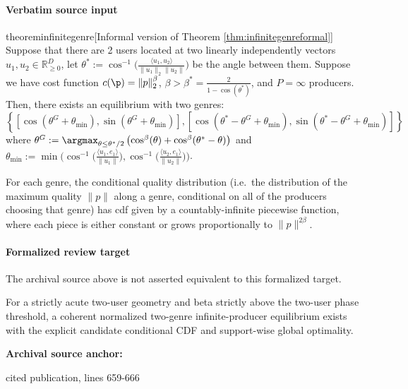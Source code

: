 \documentclass[10pt]{article}
\begin{document}
\paragraph{Verbatim source input}
\begin{ReviewVerbatim}
\begin{restatable}{theorem}{infinitegenre}[Informal version of Theorem \ref{thm:infinitegenreformal}]
\label{thm:infinitegenre}
Suppose that there are 2 users located at two linearly independently vectors $u_1, u_2 \in \mathbb{R}_{\ge 0}^D$, let $\theta^* := \cos^{-1}\Big( \frac{\langle u_1, u_2\rangle}{\|u_1\|_2 \|u_2\|} \Big)$ be the angle between them.  Suppose we have cost function $c(\p) = \|p\|_2^{\beta}$, $\beta > \beta^* = \frac{2}{1 - \cos(\theta^*)}$, and $P = \infty$ producers. Then, there exists an equilibrium with two genres:
\[\left\{[\cos(\theta^G + \theta_{\text{min}}), \sin(\theta^G + \theta_{\text{min}})], [\cos(\theta^* - \theta^G + \theta_{\text{min}}), \sin(\theta^* - \theta^G + \theta_{\text{min}})] \right\} \]
where $\theta^G := \argmax_{\theta \le \theta^*/2} \left(\cos^{\beta}(\theta) + \cos^{\beta}(\theta^* - \theta)\right)$ and $\theta_{\text{min}} := \min\big(\cos^{-1}\big(\frac{\langle u_1, e_1\rangle}{\|u_1\|} \big) , \cos^{-1}\big(\frac{\langle u_2, e_1\rangle}{\|u_2\|} \big) \big)$.

For each genre, the conditional quality distribution (i.e.~the distribution of the maximum quality $\|p\|$ along a genre, conditional on all of the producers choosing that genre) has cdf given by a countably-infinite piecewise function, where each piece is either constant or grows proportionally to $\|p\|^{2\beta}$.
\end{restatable}
\end{ReviewVerbatim}


\paragraph{Formalized review target}
The archival source above is not asserted equivalent to this formalized target.
\begin{ReviewVerbatim}
For a strictly acute two-user geometry and beta strictly above the two-user phase threshold, a coherent normalized two-genre infinite-producer equilibrium exists with the explicit candidate conditional CDF and support-wise global optimality.
\end{ReviewVerbatim}

\textbf{Archival source anchor:} {\footnotesize\raggedright cited publication, lines 659-\allowbreak{}666\par}
\end{document}
